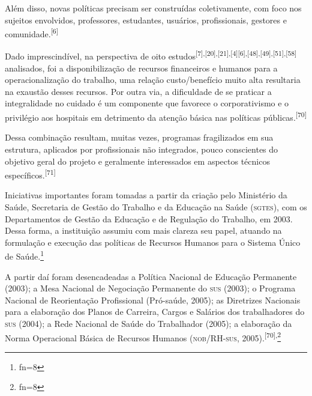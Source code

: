 \documentclass{article}
\makeatletter
\newcommand{\fn}{\afterassignment\fn@aux\count0=}
\newcommand{\fn@aux}{\csname fn\the\count0\endcsname}
\makeatother
\begin{document}
Além disso, novas políticas precisam ser construídas coletivamente, com foco nos
sujeitos envolvidos, professores, estudantes, usuários, profissionais, gestores
e comunidade.\textsuperscript{[}\textsuperscript{6}\textsuperscript{]}

Dado imprescindível, na perspectiva de oito estudos\textsuperscript{[}\textsuperscript{7}\textsuperscript{]}\textsuperscript{,}\textsuperscript{[}\textsuperscript{20}\textsuperscript{]}\textsuperscript{,}\textsuperscript{[}\textsuperscript{21}\textsuperscript{]}\textsuperscript{,}\textsuperscript{[}\textsuperscript{4}\textsuperscript{]}\textsuperscript{[}\textsuperscript{6}\textsuperscript{]}\textsuperscript{,}\textsuperscript{[}\textsuperscript{48}\textsuperscript{]}\textsuperscript{,}\textsuperscript{[}\textsuperscript{49}\textsuperscript{]}\textsuperscript{,}\textsuperscript{[}\textsuperscript{51}\textsuperscript{]}\textsuperscript{,}\textsuperscript{[}\textsuperscript{58}\textsuperscript{]}
analisados, foi a disponibilização de recursos financeiros e humanos para a
operacionalização do trabalho, uma relação custo/benefício muito alta resultaria
na exaustão desses recursos. Por outra via, a dificuldade de se praticar a
integralidade no cuidado é um componente que favorece o corporativismo e o
privilégio aos hospitais em detrimento da atenção básica nas políticas públicas.\textsuperscript{[}\textsuperscript{70}\textsuperscript{]}

Dessa combinação resultam, muitas vezes, programas fragilizados em sua
estrutura, aplicados por profissionais não integrados, pouco conscientes do
objetivo geral do projeto e geralmente interessados em aspectos técnicos
específicos.\textsuperscript{[}\textsuperscript{71}\textsuperscript{]}

Iniciativas importantes foram tomadas a partir da criação pelo Ministério da
Saúde, Secretaria de Gestão do Trabalho e da Educação na Saúde (\textsc{sgtes}), com os
Departamentos de Gestão da Educação e de Regulação do Trabalho, em 2003. Dessa
forma, a instituição assumiu com mais clareza seu papel, atuando na formulação e
execução das políticas de Recursos Humanos para o Sistema Único de Saúde.\footnote{\fn8}

A partir daí foram desencadeadas a Política Nacional de Educação Permanente
(2003); a Mesa Nacional de Negociação Permanente do \textsc{sus} (2003); o Programa
Nacional de Reorientação Profissional (Pró-saúde, 2005); as Diretrizes Nacionais
para a elaboração dos Planos de Carreira, Cargos e Salários dos trabalhadores do
\textsc{sus} (2004); a Rede Nacional de Saúde do Trabalhador (2005); a elaboração da
Norma Operacional Básica de Recursos Humanos (\textsc{nob}/RH-\textsc{sus}, 2005).\textsuperscript{[}\textsuperscript{70}\textsuperscript{]}\textsuperscript{,}\footnote{\fn8}
\end{document}
